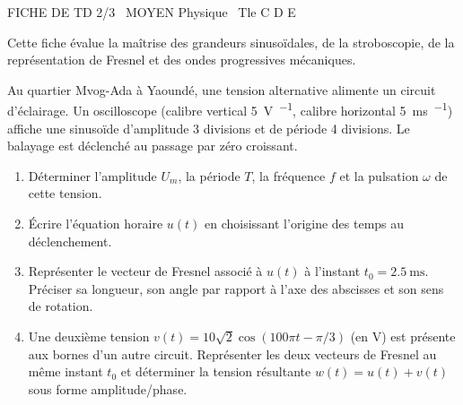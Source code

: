 \documentclass[11pt]{article}
\begin{document}
\begin{tcolorbox}[enhanced,colback=popink,colframe=popink,arc=10pt,boxrule=0pt,left=12pt,right=12pt,top=9pt,bottom=9pt]
{\color{white}\popxbold\small FICHE DE TD 2/3 \textbullet\ MOYEN \hfill Physique \textbullet\ Tle C D E\par}
\end{tcolorbox}
\vspace{4pt}
Cette fiche évalue la maîtrise des grandeurs sinusoïdales, de la stroboscopie, de la représentation de Fresnel et des ondes progressives mécaniques.

\begin{exercice}
Au quartier Mvog-Ada à Yaoundé, une tension alternative alimente un circuit d'éclairage. Un oscilloscope (calibre vertical \SI{5}{\volt\per\division}, calibre horizontal \SI{5}{\milli\second\per\division}) affiche une sinusoïde d'amplitude 3 divisions et de période 4 divisions. Le balayage est déclenché au passage par zéro croissant.
\begin{enumerate}
    \item Déterminer l'amplitude $U_m$, la période $T$, la fréquence $f$ et la pulsation $\omega$ de cette tension.
    \item Écrire l'équation horaire $u(t)$ en choisissant l'origine des temps au déclenchement.
    \item Représenter le vecteur de Fresnel associé à $u(t)$ à l'instant $t_0 = \SI{2,5}{\milli\second}$. Préciser sa longueur, son angle par rapport à l'axe des abscisses et son sens de rotation.
    \item Une deuxième tension $v(t) = 10\sqrt{2}\cos(100\pi t - \pi/3)$ (en V) est présente aux bornes d'un autre circuit. Représenter les deux vecteurs de Fresnel au même instant $t_0$ et déterminer la tension résultante $w(t) = u(t) + v(t)$ sous forme amplitude/phase.
\end{enumerate}
\end{exercice}
\end{document}
